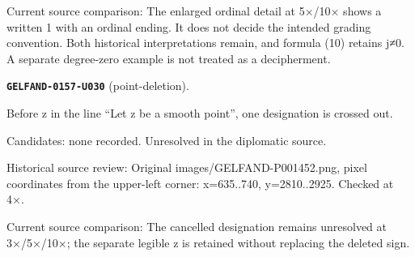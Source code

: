 Current source comparison: The enlarged ordinal detail at 5×/10× shows a written 1 with an ordinal ending. It does not decide the intended grading convention. Both historical interpretations remain, and formula (10) retains j≠0. A separate degree-zero example is not treated as a decipherment.\par\medskip
\par\noindent\leavevmode{}\label{GELFAND-0157-U030}\label{GELFAND-P001452:point-deletion}\textbf{\texttt{GELFAND-0157-U030}} (point-deletion).\nopagebreak[4]\par
Before z in the line “Let z be a smooth point”, one designation is crossed out.\par
Candidates: none recorded. Unresolved in the diplomatic source.\par
Historical source review: Original images/GELFAND-P001452.png, pixel coordinates from the upper-left corner: x=635..740, y=2810..2925. Checked at 4×.\par
Current source comparison: The cancelled designation remains unresolved at 3×/5×/10×; the separate legible z is retained without replacing the deleted sign.\par\medskip
